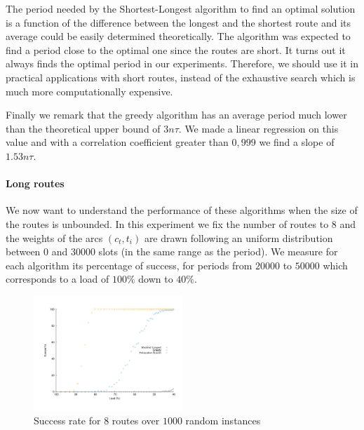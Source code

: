 \documentclass[10pt, conference, letterpaper]{IEEEtran}
\begin{document}
      The period needed by the Shortest-Longest algorithm to find an optimal solution is a function of the difference between the longest and the shortest route and its average could be easily determined theoretically. The algorithm was expected to find a period close to the optimal one since the routes are short. It turns out it always finds the optimal period in our experiments. Therefore, we should use it in practical applications with short routes, instead of the exhaustive search which is much more computationally expensive. 
      
      Finally we remark that the greedy algorithm has an average period much lower than the theoretical upper bound of $3n\tau$. We made a linear regression on this value and with a correlation coefficient greater than $0,999$ we find a slope of $1.53n\tau$.
      
      

      \paragraph{Long routes}
      
      We now want to understand the performance of these algorithms when the size of the routes is unbounded. In this experiment we fix the number of routes to $8$ and the weights of the arcs $(c_t,t_i)$ are drawn following an uniform distribution between $0$ and $30000$ slots (in the same range as the period). We measure for each algorithm its percentage of success, for periods from $20000$ to $50000$ which corresponds to a load of $100\%$ down to $40\%$.
      
\begin{figure}

       \begin{center}
      \hspace{-0.5cm}\includegraphics[width=0.5\textwidth]{echec_longues.pdf}
      \end{center}
      \caption{Success rate for $8$ routes over $1000$ random instances}
     \end{figure}
      
\end{document}
